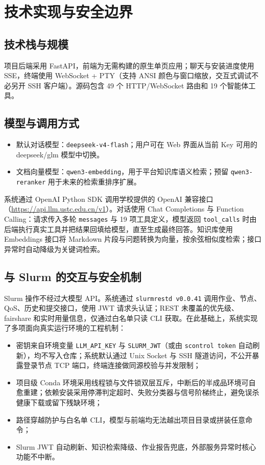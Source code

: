 \documentclass[UTF8,11pt,a4paper]{ctexart}
\newcommand{\code}[1]{\texttt{\small #1}}
\begin{document}
\section{技术实现与安全边界}
\subsection{技术栈与规模}
项目后端采用 FastAPI，前端为无需构建的原生单页应用；聊天与安装进度使用 SSE，终端使用 WebSocket + PTY（支持 ANSI 颜色与窗口缩放，交互式调试不必另开 SSH 客户端）。源码包含 49 个 HTTP/WebSocket 路由和 19 个智能体工具。

\subsection{模型与调用方式}
\begin{itemize}
  \item 默认对话模型：\code{deepseek-v4-flash}；用户可在 Web 界面从当前 Key 可用的 deepseek/glm 模型中切换。
  \item 文档向量模型：\code{qwen3-embedding}，用于平台知识库语义检索；预留 \code{qwen3-reranker} 用于未来的检索重排序扩展。
\end{itemize}

系统通过 OpenAI Python SDK 调用学校提供的 OpenAI 兼容接口（\url{https://api.llm.ustc.edu.cn/v1}）。对话使用 Chat Completions 与 Function Calling：请求传入多轮 \code{messages} 与 19 项工具定义，模型返回 \code{tool\_calls} 时由后端执行真实工具并把结果回填给模型，直至生成最终回答。知识库使用 Embeddings 接口将 Markdown 片段与问题转换为向量，按余弦相似度检索；接口异常时自动降级为关键词检索。

\subsection{与 Slurm 的交互与安全机制}
Slurm 操作不经过大模型 API。系统通过 \code{slurmrestd v0.0.41} 调用作业、节点、QoS、历史和提交接口，使用 JWT 请求头认证；REST 未覆盖的优先级、fairshare 和实时用量信息，仅通过白名单只读 CLI 获取。在此基础上，系统实现了多项面向真实运行环境的工程机制：
\begin{itemize}
  \item 密钥来自环境变量 \code{LLM\_API\_KEY} 与 \code{SLURM\_JWT}（或由 \code{scontrol token} 自动刷新），均不写入仓库；系统默认通过 Unix Socket 与 SSH 隧道访问，不公开暴露登录节点 TCP 端口，终端连接做同源校验与并发限制；
  \item 项目级 Conda 环境采用线程锁与文件锁双层互斥，中断后的半成品环境可自愈重建；依赖安装采用停滞判定超时、失败分类器与信号阶梯终止，避免误杀健康下载或留下残缺环境；
  \item 路径穿越防护与白名单 CLI，模型与前端均无法越出项目目录或拼装任意命令；
  \item Slurm JWT 自动刷新、知识检索降级、作业报告兜底，外部服务异常时核心功能不中断。
\end{itemize}
\end{document}
